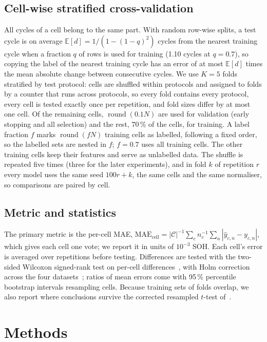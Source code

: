 \documentclass[11pt,a4paper]{article}
\newcommand{\E}{\mathbb{E}}
\begin{document}
\subsection{Cell-wise stratified cross-validation}
All cycles of a cell belong to the same part. With random row-wise splits, a test cycle is on average
$\E[d] = 1/(1 - (1-q)^2)$ cycles from the nearest training cycle when a fraction $q$ of rows is used for training
(1.10 cycles at $q = 0.7$), so copying the label of the nearest training cycle has an error of at most $\E[d]$ times
the mean absolute change between consecutive cycles. We use $K = 5$ folds stratified by test protocol: cells are shuffled within protocols and
assigned to folds by a counter that runs across protocols, so every fold contains every protocol, every cell is
tested exactly once per repetition, and fold sizes differ by at most one cell. Of the remaining cells,
$\operatorname{round}(0.1N)$ are used for validation (early stopping and all selection) and the rest, 70\,\% of the
cells, for training. A label fraction $f$ marks
$\operatorname{round}(fN)$ training cells as labelled, following a fixed order, so the labelled sets are nested in $f$;
$f = 0.7$ uses all training cells. The other training cells keep their features and serve as unlabelled data. The
shuffle is repeated five times (three for the later experiments), and in fold $k$ of repetition $r$ every model uses the
same seed $100r + k$, the same cells and the same normaliser, so comparisons are paired by cell.

\subsection{Metric and statistics}
The primary metric is the per-cell MAE, $\mathrm{MAE}_\text{cell} = |\mathcal{C}|^{-1}\sum_c n_c^{-1}\sum_n
|\hat y_{c,n} - y_{c,n}|$, which gives each cell one vote; we report it in units of $10^{-3}$ SOH. Each cell's error is
averaged over repetitions before testing. Differences are tested with the two-sided Wilcoxon signed-rank test on
per-cell differences~\citep{wilcoxon1945}, with Holm correction across the four datasets~\citep{holm1979}; ratios of
mean errors come with 95\,\% percentile bootstrap intervals resampling cells. Because training sets of folds overlap,
we also report where conclusions survive the corrected resampled $t$-test of~\citet{nadeau2003}.

\section{Methods}\label{sec:methods}
\end{document}
